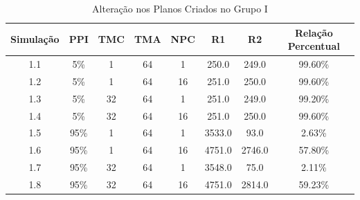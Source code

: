 \begin{table}
    \begin{center}
        \caption{ Alteração nos Planos Criados no Grupo I }
        \label{table:plansaltv1}
        \begin{tabular}{ |c|c|c|c|c|c|c|c| }
            \hline
            \textbf{Simulação} & \textbf{PPI} & \textbf{TMC} & \textbf{TMA} & \textbf{NPC} & \textbf{R1} & \textbf{R2} & \textbf{Relação Percentual}\\
            \hline
            1.1 & 5\% & 1 & 64 & 1 & 250.0 & 249.0 & 99.60\%\\
            \hline
            1.2 & 5\% & 1 & 64 & 16 & 251.0 & 250.0 & 99.60\%\\
            \hline
            1.3 & 5\% & 32 & 64 & 1 & 251.0 & 249.0 & 99.20\%\\
            \hline
            1.4 & 5\% & 32 & 64 & 16 & 251.0 & 250.0 & 99.60\%\\
            \hline
            1.5 & 95\% & 1 & 64 & 1 & 3533.0 & 93.0 & 2.63\%\\
            \hline
            1.6 & 95\% & 1 & 64 & 16 & 4751.0 & 2746.0 & 57.80\%\\
            \hline
            1.7 & 95\% & 32 & 64 & 1 & 3548.0 & 75.0 & 2.11\%\\
            \hline
            1.8 & 95\% & 32 & 64 & 16 & 4751.0 & 2814.0 & 59.23\%\\
            \hline
            
        \end{tabular}{}
    \end{center}{}
\end{table}


